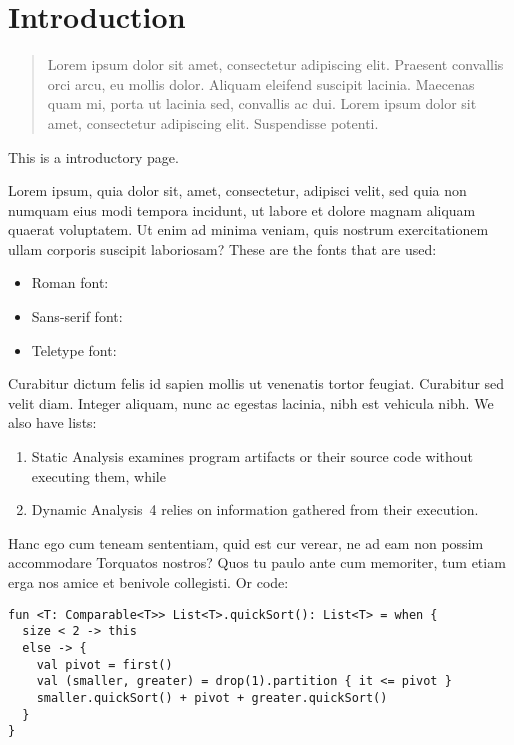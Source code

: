 \chapter{Introduction}%
\label{chap:introduction}

\begin{abstract}
Lorem ipsum dolor sit amet, consectetur adipiscing elit. Praesent convallis orci arcu, eu mollis dolor. Aliquam eleifend suscipit lacinia. Maecenas quam mi, porta ut lacinia sed, convallis ac dui. Lorem ipsum dolor sit amet, consectetur adipiscing elit. Suspendisse potenti.
\end{abstract}


\newpage

This is a introductory page.


Lorem ipsum, quia dolor sit, amet, consectetur, adipisci velit, sed quia non numquam eius modi tempora incidunt, ut labore et dolore magnam aliquam quaerat voluptatem. Ut enim ad minima veniam, quis nostrum exercitationem ullam corporis suscipit laboriosam? These are the fonts that are used:

\begin{itemize}
  \item Roman font: \rmdefault
  \item Sans-serif font: \sfdefault
  \item Teletype font: \ttdefault
\end{itemize}

Curabitur dictum felis id sapien mollis ut venenatis tortor feugiat. Curabitur sed velit diam. Integer aliquam, nunc ac egestas lacinia, nibh est vehicula nibh. We also have lists:

\begin{enumerate}
  \item Static Analysis examines program artifacts or their source code without executing them, while
  \item Dynamic Analysis~4 relies on information gathered from their execution.
\end{enumerate}


Hanc ego cum teneam sententiam, quid est cur verear, ne ad eam non possim accommodare Torquatos nostros? Quos tu paulo ante cum memoriter, tum etiam erga nos amice et benivole collegisti. Or code:

\begin{lstlisting}[caption={\textsc{QuickSort}},label={lst:e1}]
fun <T: Comparable<T>> List<T>.quickSort(): List<T> = when {
  size < 2 -> this
  else -> {
    val pivot = first()
    val (smaller, greater) = drop(1).partition { it <= pivot }
    smaller.quickSort() + pivot + greater.quickSort()
  }
}
\end{lstlisting}

